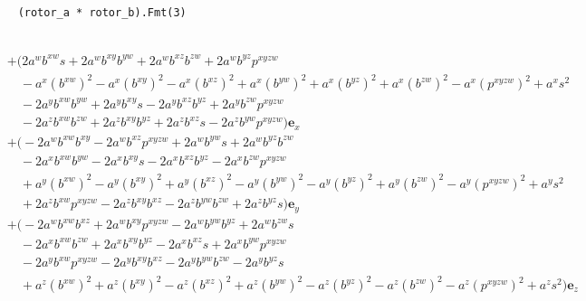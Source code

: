 \documentclass{l4proj}
\begin{document}
\begin{appendices}
\begin{lstlisting}
    (rotor_a * rotor_b).Fmt(3)
  
\end{lstlisting}

\begin{equation} 
  \begin{aligned}
    \label{eq:rotate_vec} 
  & + \Big( 2 a^{w} b^{xw} s + 2 a^{w} b^{xy} b^{yw} + 2 a^{w} b^{xz} b^{zw} + 2 a^{w} b^{yz} p^{xyzw} \\
  & \quad - a^{x} {\left ( b^{xw} \right )}^{2} - a^{x} {\left ( b^{xy} \right )}^{2} - a^{x} {\left ( b^{xz} \right )}^{2} + a^{x} {\left ( b^{yw} \right )}^{2} + a^{x} {\left ( b^{yz} \right )}^{2} + a^{x} {\left ( b^{zw} \right )}^{2} - a^{x} {\left ( p^{xyzw} \right )}^{2} + a^{x} s^{2} \\
  & \quad - 2 a^{y} b^{xw} b^{yw} + 2 a^{y} b^{xy} s - 2 a^{y} b^{xz} b^{yz} + 2 a^{y} b^{zw} p^{xyzw} \\
  & \quad - 2 a^{z} b^{xw} b^{zw} + 2 a^{z} b^{xy} b^{yz} + 2 a^{z} b^{xz} s - 2 a^{z} b^{yw} p^{xyzw} \Big) \boldsymbol{e}_{x} \\
  & + \Big( - 2 a^{w} b^{xw} b^{xy} - 2 a^{w} b^{xz} p^{xyzw} + 2 a^{w} b^{yw} s + 2 a^{w} b^{yz} b^{zw} \\
  & \quad - 2 a^{x} b^{xw} b^{yw} - 2 a^{x} b^{xy} s - 2 a^{x} b^{xz} b^{yz} - 2 a^{x} b^{zw} p^{xyzw} \\
  & \quad + a^{y} {\left ( b^{xw} \right )}^{2} - a^{y} {\left ( b^{xy} \right )}^{2} + a^{y} {\left ( b^{xz} \right )}^{2} - a^{y} {\left ( b^{yw} \right )}^{2} - a^{y} {\left ( b^{yz} \right )}^{2} + a^{y} {\left ( b^{zw} \right )}^{2} - a^{y} {\left ( p^{xyzw} \right )}^{2} + a^{y} s^{2} \\
  & \quad + 2 a^{z} b^{xw} p^{xyzw} - 2 a^{z} b^{xy} b^{xz} - 2 a^{z} b^{yw} b^{zw} + 2 a^{z} b^{yz} s \Big) \boldsymbol{e}_{y} \\
  & + \Big( - 2 a^{w} b^{xw} b^{xz} + 2 a^{w} b^{xy} p^{xyzw} - 2 a^{w} b^{yw} b^{yz} + 2 a^{w} b^{zw} s \\ 
  & \quad - 2 a^{x} b^{xw} b^{zw} + 2 a^{x} b^{xy} b^{yz} - 2 a^{x} b^{xz} s + 2 a^{x} b^{yw} p^{xyzw} \\
  & \quad - 2 a^{y} b^{xw} p^{xyzw} - 2 a^{y} b^{xy} b^{xz} - 2 a^{y} b^{yw} b^{zw} - 2 a^{y} b^{yz} s \\
  & \quad + a^{z} {\left ( b^{xw} \right )}^{2} + a^{z} {\left ( b^{xy} \right )}^{2} - a^{z} {\left ( b^{xz} \right )}^{2} + a^{z} {\left ( b^{yw} \right )}^{2} - a^{z} {\left ( b^{yz} \right )}^{2} - a^{z} {\left ( b^{zw} \right )}^{2} - a^{z} {\left ( p^{xyzw} \right )}^{2} + a^{z} s^{2} \Big) \boldsymbol{e}_{z} \\

\end{aligned}
\end{equation}
\end{appendices}
\end{document}
